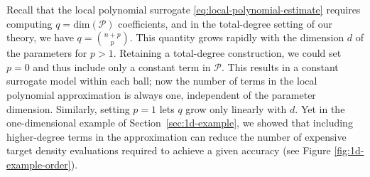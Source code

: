 
Recall that the local polynomial surrogate \eqref{eq:local-polynomial-estimate} requires computing $q = \text{dim}(\mathcal{P})$ coefficients, and in the total-degree setting of our theory, we have $q = {{n+p}\choose{p}}$. This quantity grows rapidly with the dimension $d$ of the parameters for $p>1$. %
Retaining a total-degree construction, we could set $p=0$ and thus include only a constant term in $\mathcal{P}$. This results in a constant surrogate model within each ball; now the number of terms in the local polynomial approximation is always one, independent of the parameter dimension. Similarly, setting $p=1$ lets $q$ grow only linearly with $d$. Yet in the one-dimensional example of Section~\ref{sec:1d-example}, we showed that including higher-degree terms in the approximation can reduce the number of expensive target density evaluations required to achieve a given accuracy (see Figure \ref{fig:1d-example-order}).

